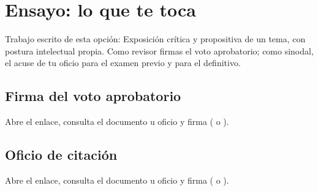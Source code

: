 \section{Ensayo: lo que te toca}
Trabajo escrito de esta opción: Exposición crítica y propositiva de un tema, con postura intelectual propia. Como revisor firmas el voto aprobatorio; como sinodal, el acuse de tu oficio para el examen previo y para el definitivo.
\subsection{Firma del voto aprobatorio}
Abre el enlace, consulta el documento u oficio y firma ( o ).
\subsection{Oficio de citación}
Abre el enlace, consulta el documento u oficio y firma ( o ).
